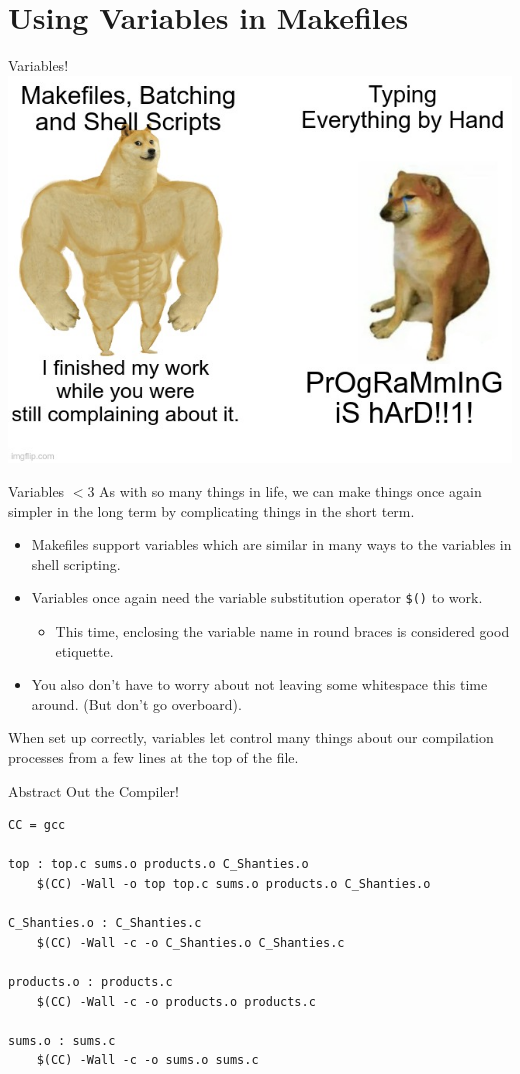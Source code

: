 \documentclass[11pt]{beamer}
\begin{document}
\section[Variables]{Using Variables in Makefiles}
\begin{frame}{Variables!}
\center
\includegraphics[scale=0.3]{scripting.jpg}
\end{frame}

\begin{frame}{Variables $<$3}
As with so many things in life, we can make things once again simpler in the long term by complicating things in the short term.  
\begin{itemize}
\item Makefiles support variables which are similar in many ways to the variables in shell scripting.  
\item Variables once again need the variable substitution operator \texttt{\$()} to work.
\begin{itemize}
\item This time, enclosing the variable name in round braces is considered good etiquette.  
\end{itemize}
\item You also don't have to worry about not leaving some whitespace this time around.  (But don't go overboard).
\end{itemize}
When set up correctly, variables let control many things about our compilation processes from a few lines at the top of the file.  
\end{frame}

\begin{frame}[fragile=singleslide]{Abstract Out the Compiler!}
\begin{lstlisting}[style=terminal]
CC = gcc

top : top.c sums.o products.o C_Shanties.o 
	$(CC) -Wall -o top top.c sums.o products.o C_Shanties.o

C_Shanties.o : C_Shanties.c
	$(CC) -Wall -c -o C_Shanties.o C_Shanties.c

products.o : products.c
	$(CC) -Wall -c -o products.o products.c

sums.o : sums.c
	$(CC) -Wall -c -o sums.o sums.c
\end{lstlisting}
\end{frame}
\end{document}
